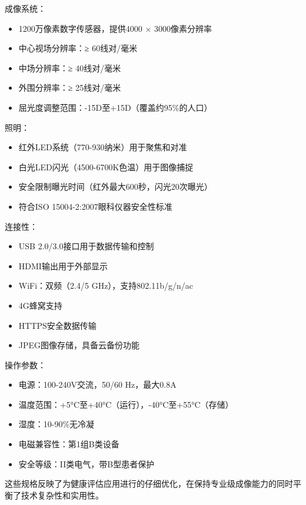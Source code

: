 \documentclass[
  Letterpaper,
]{scrbook}
\providecommand{\tightlist}{%
  \setlength{\itemsep}{0pt}\setlength{\parskip}{0pt}}\usepackage{longtable,booktabs,array}
\begin{document}
成像系统：

\begin{itemize}
\tightlist
\item
  1200万像素数字传感器，提供4000 × 3000像素分辨率
\item
  中心视场分辨率：≥ 60线对/毫米
\item
  中场分辨率：≥ 40线对/毫米
\item
  外围分辨率：≥ 25线对/毫米
\item
  屈光度调整范围：-15D至+15D（覆盖约95\%的人口）
\end{itemize}

照明：

\begin{itemize}
\tightlist
\item
  红外LED系统（770-930纳米）用于聚焦和对准
\item
  白光LED闪光（4500-6700K色温）用于图像捕捉
\item
  安全限制曝光时间（红外最大600秒，闪光20次曝光）
\item
  符合ISO 15004-2:2007眼科仪器安全性标准
\end{itemize}

连接性：

\begin{itemize}
\tightlist
\item
  USB 2.0/3.0接口用于数据传输和控制
\item
  HDMI输出用于外部显示
\item
  WiFi：双频（2.4/5 GHz），支持802.11b/g/n/ac
\item
  4G蜂窝支持
\item
  HTTPS安全数据传输
\item
  JPEG图像存储，具备云备份功能
\end{itemize}

操作参数：

\begin{itemize}
\tightlist
\item
  电源：100-240V交流，50/60 Hz，最大0.8A
\item
  温度范围：+5°C至+40°C（运行），-40°C至+55°C（存储）
\item
  湿度：10-90\%无冷凝
\item
  电磁兼容性：第1组B类设备
\item
  安全等级：II类电气，带B型患者保护
\end{itemize}

这些规格反映了为健康评估应用进行的仔细优化，在保持专业级成像能力的同时平衡了技术复杂性和实用性。
\end{document}
